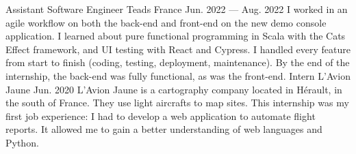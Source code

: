 \begin{MainPart}
  \Experience%
  {\ColorHighlight}
  {Assistant Software Engineer}
  {Teads France}
  {Jun. 2022 --- Aug. 2022}
  {
    I worked in an agile workflow on both the back-end and front-end on the new demo console application. I learned about pure functional programming in Scala with the Cats Effect framework, and UI testing with React and Cypress. I handled every feature from start to finish (coding, testing, deployment, maintenance). By the end of the internship, the back-end was fully functional, as was the front-end.
  }
  \Experience%
  {\ColorHighlight}
  {Intern}
  {L'Avion Jaune}
  {Jun. 2020}
  {
    L'Avion Jaune is a cartography company located in Hérault, in the south of France. They use light aircrafts to map sites. This internship was my first job experience: I had to develop a web application to automate flight reports. It allowed me to gain a better understanding of web languages and Python.
  }
\end{MainPart}